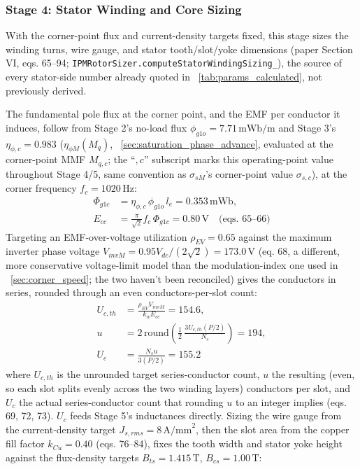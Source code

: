 \documentclass[10pt,final,journal,a4paper,oneside,twocolumn]{IEEEtran}
\begin{document}
\subsubsection{Stage 4: Stator Winding and Core Sizing}
\label{sec:stator_winding_sizing}
With the corner-point flux and current-density targets fixed, this stage sizes the winding turns, wire gauge, and stator tooth/slot/yoke dimensions (paper Section VI, eqs. 65--94; \texttt{IPMRotorSizer.\allowbreak computeStatorWindingSizing\_}), the source of every stator-side number already quoted in \tablename~\ref{tab:params_calculated}, not previously derived.

The fundamental pole flux at the corner point, and the EMF per conductor it induces, follow from Stage 2's no-load flux $\phi_{g1o}=7.71\,\text{mWb/m}$ and Stage 3's $\eta_{\phi,c}=0.983$ ($\eta_{\phi M}(M_q)$, \sectionname~\ref{sec:saturation_phase_advance}, evaluated at the corner-point MMF $M_{q,c}$; the ``$,c$'' subscript marks this operating-point value throughout Stage 4/5, same convention as $\sigma_{sM}$'s corner-point value $\sigma_{s,c}$), at the corner frequency $f_c=1020\,\text{Hz}$:
\begin{equation}
\label{eq:phi_g1c}
\begin{aligned}
\Phi_{g1c} &= \eta_{\phi,c}\,\phi_{g1o}\,l_e = 0.353\,\text{mWb}, \\
E_{cc} &= \frac{\pi}{\sqrt2}f_c\,\Phi_{g1c} = 0.80\,\text{V} \quad\text{(eqs. 65--66)}
\end{aligned}
\end{equation}
Targeting an EMF-over-voltage utilization $\rho_{EV}=0.65$ against the maximum inverter phase voltage $V_{invM}=0.95V_{dc}/(2\sqrt2)=173.0\,\text{V}$ (eq. 68, a different, more conservative voltage-limit model than the modulation-index one used in \sectionname~\ref{sec:corner_speed}; the two haven't been reconciled) gives the conductors in series, rounded through an even conductors-per-slot count:
\begin{equation}
\label{eq:conductors_series}
\begin{aligned}
U_{c,th} &= \frac{\rho_{EV}V_{invM}}{k_w E_{cc}} = 154.6, \\
u &= 2\,\text{round}\!\left(\tfrac12\,\frac{3U_{c,th}(P/2)}{N_s}\right) = 194, \\
U_c &= \frac{N_s u}{3(P/2)} = 155.2
\end{aligned}
\end{equation}
where $U_{c,th}$ is the unrounded target series-conductor count, $u$ the resulting (even, so each slot splits evenly across the two winding layers) conductors per slot, and $U_c$ the actual series-conductor count that rounding $u$ to an integer implies (eqs. 69, 72, 73). $U_c$ feeds Stage 5's inductances directly. Sizing the wire gauge from the current-density target $J_{s,rms}=8\,\text{A/mm}^2$, then the slot area from the copper fill factor $k_{Cu}=0.40$ (eqs. 76--84), fixes the tooth width and stator yoke height against the flux-density targets $B_{ts}=1.415\,\text{T}$, $B_{cs}=1.00\,\text{T}$:
\end{document}
